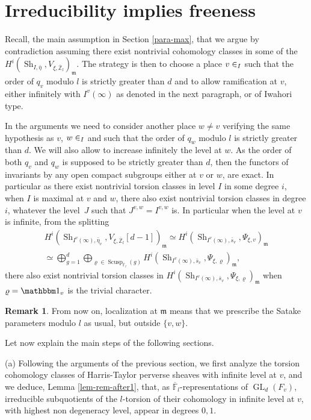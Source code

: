 \documentclass[JEP,XML,SOM,Unicode,published]{cedram}
\let\mathds\mathbbm
\newcommand{\NoChangel}[1]{%
\expandafter\let\csname old\string#1\endcsname=#1
\let#1=\relax
\newcommand{#1}{\mathcode`l="716C\csname old\string#1\endcsname\mathcode`l="7160 }%
}
\DeclareMathOperator{\GL}{GL}
\theoremstyle{plain}
\theoremstyle{definition}
\newtheorem*{remark}{Remark}
\numberwithin{equation}{subsection}
\newcommand\Fm{{\mathbb F}}
\newcommand\Zm{{\mathbb Z}}
\DeclareMathOperator{\sh}{Sh}
\DeclareMathOperator{\scusp}{Scusp}
\DeclareMathOperator{\spl}{Spl}\NoChangel{\spl}
\let \oo=\infty
\begin{document}
\section{Irreducibility implies freeness}
\label{para-proof}

Recall, \cf the main assumption in Section \ref{para-max},
that we argue by contradiction assuming there exist nontrivial
cohomology classes in some of the
$H^i(\sh_{I,\bar \eta},V_{\xi,\overline \Zm_l})_{\mathfrak m}$.
The strategy is then to choose a place $v \in \spl_I$ such that the order of $q_v$
modulo $l$ is strictly greater than $d$ and to allow ramification at $v$, either infinitely
with $I^v(\oo)$ as denoted in the next paragraph, or
of Iwahori type.

In the arguments we need to consider another place $w \neq v$
verifying the same hypothesis as $v$, \ie $w \in \spl_I$ and such that the order of
$q_w$ modulo $l$ is strictly greater than $d$. We will also allow to
increase infinitely the level at $w$. As the order of both $q_v$ and
$q_w$ is supposed to be strictly greater than $d$, then the functors of invariants
by any open compact subgroups either at $v$ or $w$, are exact. In particular
as there exist nontrivial torsion classes in level $I$ in some degree $i$, when
$I$ is maximal at $v$ and
$w$, there also exist nontrivial torsion classes in degree $i$, whatever the
level~$J$ such that $J^{v,w} = I^{v,w}$ is.
In particular when the level at $v$ is infinite, from the splitting
\begin{multline*}
H^i(\sh_{I^v(\oo),\bar \eta_v},V_{\xi,\overline \Zm_l}[d-1])_{\mathfrak m} \simeq
H^i(\sh_{I^v(\oo),\bar s_v},\Psi_{\xi,v})_{\mathfrak m} \\
\simeq \bigoplus_{g=1}^d
\bigoplus_{\varrho \in \scusp_{\overline \Fm_l}(g)} H^i(\sh_{I^v(\oo),\bar s_v},
\Psi_{\xi,\varrho})_{\mathfrak m},
\end{multline*}
there also exist nontrivial torsion classes
in $H^i(\sh_{I^v(\oo),\bar s_v},\Psi_{\xi,\varrho})_{\mathfrak m}$
when $\varrho=\mathds 1_v$ is the trivial character.

\begin{remark}
From now on, localization at $\mathfrak m$ means that we prescribe
the Satake parameters modulo $l$ as usual, but outside $\{v,w\}$.
\end{remark}

Let now explain the main steps of the following sections.

(a) Following the arguments of the previous section,
we first analyze the torsion cohomology
classes of Harris-Taylor perverse sheaves with infinite level at $v$, and we deduce,
\cf Lemma \ref{lem-rem-after1}, that, as $\overline \Fm_l$-representations
of $\GL_d(F_v)$,
irreducible subquotients of the $l$-torsion
of their cohomology in infinite level at $v$, with highest non degeneracy level, appear in degrees $0,1$.
\end{document}
